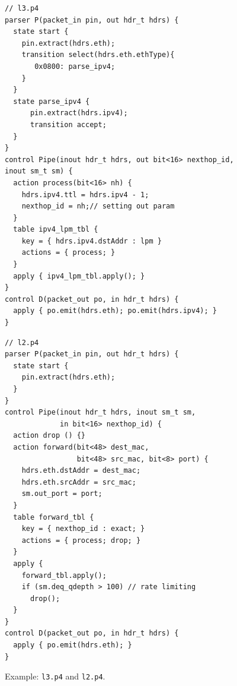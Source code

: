 \documentclass{hotnets19}
\begin{document}
\begin{figure}[ht]
\noindent \begin{minipage}[t]{.48\textwidth}
\begin{lstlisting}[frame=none]
// l3.p4
parser P(packet_in pin, out hdr_t hdrs) {
  state start {
    pin.extract(hdrs.eth);
    transition select(hdrs.eth.ethType){
       0x0800: parse_ipv4;
    }
  }
  state parse_ipv4 {
      pin.extract(hdrs.ipv4);
      transition accept;
  }
}
control Pipe(inout hdr_t hdrs, out bit<16> nexthop_id, inout sm_t sm) {
  action process(bit<16> nh) {
    hdrs.ipv4.ttl = hdrs.ipv4 - 1;
    nexthop_id = nh;// setting out param
  }
  table ipv4_lpm_tbl {
    key = { hdrs.ipv4.dstAddr : lpm } 
    actions = { process; }
  }
  apply { ipv4_lpm_tbl.apply(); }
}
control D(packet_out po, in hdr_t hdrs) {
  apply { po.emit(hdrs.eth); po.emit(hdrs.ipv4); }
}
\end{lstlisting}
\end{minipage}
\hfill\begin{minipage}[t]{.48\textwidth}
\begin{lstlisting}[frame=none]
// l2.p4
parser P(packet_in pin, out hdr_t hdrs) {
  state start {
    pin.extract(hdrs.eth);
  }
}
control Pipe(inout hdr_t hdrs, inout sm_t sm, 
             in bit<16> nexthop_id) {
  action drop () {}           
  action forward(bit<48> dest_mac, 
                 bit<48> src_mac, bit<8> port) {
    hdrs.eth.dstAddr = dest_mac;
    hdrs.eth.srcAddr = src_mac;
    sm.out_port = port;    
  }
  table forward_tbl {
    key = { nexthop_id : exact; } 
    actions = { process; drop; }
  }
  apply {
    forward_tbl.apply(); 
    if (sm.deq_qdepth > 100) // rate limiting
      drop();
  }
}
control D(packet_out po, in hdr_t hdrs) {
  apply { po.emit(hdrs.eth); }
}
\end{lstlisting}
\end{minipage}
\caption{Example: \texttt{l3.p4} and \texttt{l2.p4}.}
\label{fig:l3.p4.l2.p4}
\end{figure}


\end{document}
